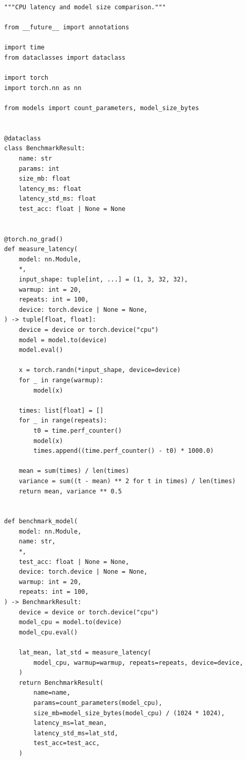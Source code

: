\begin{verbatim}
"""CPU latency and model size comparison."""

from __future__ import annotations

import time
from dataclasses import dataclass

import torch
import torch.nn as nn

from models import count_parameters, model_size_bytes


@dataclass
class BenchmarkResult:
    name: str
    params: int
    size_mb: float
    latency_ms: float
    latency_std_ms: float
    test_acc: float | None = None


@torch.no_grad()
def measure_latency(
    model: nn.Module,
    *,
    input_shape: tuple[int, ...] = (1, 3, 32, 32),
    warmup: int = 20,
    repeats: int = 100,
    device: torch.device | None = None,
) -> tuple[float, float]:
    device = device or torch.device("cpu")
    model = model.to(device)
    model.eval()

    x = torch.randn(*input_shape, device=device)
    for _ in range(warmup):
        model(x)

    times: list[float] = []
    for _ in range(repeats):
        t0 = time.perf_counter()
        model(x)
        times.append((time.perf_counter() - t0) * 1000.0)

    mean = sum(times) / len(times)
    variance = sum((t - mean) ** 2 for t in times) / len(times)
    return mean, variance ** 0.5


def benchmark_model(
    model: nn.Module,
    name: str,
    *,
    test_acc: float | None = None,
    device: torch.device | None = None,
    warmup: int = 20,
    repeats: int = 100,
) -> BenchmarkResult:
    device = device or torch.device("cpu")
    model_cpu = model.to(device)
    model_cpu.eval()

    lat_mean, lat_std = measure_latency(
        model_cpu, warmup=warmup, repeats=repeats, device=device,
    )
    return BenchmarkResult(
        name=name,
        params=count_parameters(model_cpu),
        size_mb=model_size_bytes(model_cpu) / (1024 * 1024),
        latency_ms=lat_mean,
        latency_std_ms=lat_std,
        test_acc=test_acc,
    )
\end{verbatim}


